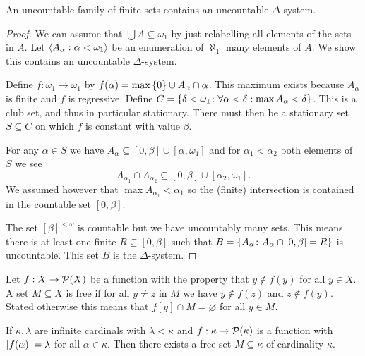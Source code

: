 \begin{theorem}
    An uncountable family of finite sets contains an uncountable
    \(\Delta\)-system.

    \begin{proof}
        We can assume that \(\bigcup A\subseteq\omega_{1}\) by just relabelling
        all elements of the sets in \(A\). Let
        \(\left<A_{\alpha}:\alpha<\omega_{1}\right>\) be an enumeration of
        \(\aleph_{1}\) many elements of \(A\). We show this contains an
        uncountable \(\Delta\)-system.

        Define \(f:\omega_{1}\to\omega_{1}\) by \(f(\alpha)=\max\left\{0\right\}\cup
        A_{\alpha}\cap\alpha\). This maximum exists because \(A_{\alpha}\) is
        finite and \(f\) is regressive. Define
        \(C=\left\{\delta<\omega_{1}\colon\forall\alpha<\delta:\max
            A_{\alpha}<\delta\right\}\). This is a club set, and thus in particular
        stationary. There must then be a stationary set \(S\subseteq C\) on
        which \(f\) is constant with value \(\beta\).

        For any \(\alpha\in S\) we have
        \(A_{\alpha}\subseteq[0,\beta]\cup[\alpha,\omega_{1}]\) and for
        \(\alpha_{1}<\alpha_{2}\) both elements of \(S\) we see
        \[
            A_{\alpha_{1}}\cap A_{\alpha_{2}}\subseteq[0,\beta]\cup[\alpha_{2},\omega_{1}].
        \]
        We assumed however that \(\max A_{\alpha_{1}}<\alpha_{1}\) so the
        (finite) intersection is contained in the countable set \([0,\beta]\).

        The set \([\beta]^{<\omega}\) is countable but we have uncountably many
        sets. This means there is at least one finite \(R\subseteq[0,\beta]\)
        such that \(B=\left\{A_{\alpha}\colon A_{\alpha}\cap[0,\beta]=R\right\}\) is
        uncountable. This set \(B\) is the \(\Delta\)-system.
    \end{proof}
\end{theorem}

\begin{definition}
    Let \(f:X\to\mathcal{P}(X)\) be a function with the property that \(y\notin
    f(y)\) for all \(y\in X\). A set \(M\subseteq X\) is free if for all \(y\neq
    z\) in \(M\) we have \(y\notin f(z)\) and \(z\notin f(y)\). Stated otherwise
    this means that \(f[y]\cap M=\varnothing\) for all \(y\in M\).
\end{definition}

\begin{theorem}
    If \(\kappa,\lambda\) are infinite cardinals with \(\lambda<\kappa\) and
    \(f:\kappa\to\mathcal{P}(\kappa)\) is a function with
    \(\lvert f(\alpha)\rvert=\lambda\) for all \(\alpha\in\kappa\). Then there exists a
    free set \(M\subseteq\kappa\) of cardinality \(\kappa\).
\end{theorem}

